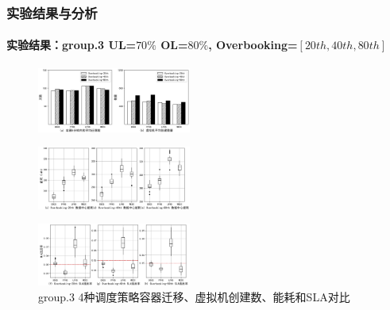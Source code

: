\begin{frame}
\frametitle{实验结果与分析}
\framesubtitle{实验结果：group.3 \textbf{UL=$70\%$ OL=$80\%$, Overbooking=$[20th,40th,80th]$}}
\begin{minipage}{\textwidth}
    \centering
    \begin{figure}[htb]
    \centering
    \includegraphics[width=0.45\textwidth]{figures/fig17_4-6_a.png}
    \end{figure}
\end{minipage}
\begin{minipage}{\textwidth}
    \centering
    \begin{figure}[htb]
    \centering
    \includegraphics[width=0.45\textwidth]{figures/fig17_4-6_b.png}
    \end{figure}
\end{minipage}
\begin{minipage}{\textwidth}
    \centering
    \begin{figure}[htb]
    \centering
    \includegraphics[width=0.45\textwidth]{figures/fig17_4-6_c.png}
    \caption{group.3 4种调度策略容器迁移、虚拟机创建数、能耗和SLA对比}
    \label{fig:fig17}
    \end{figure}
\end{minipage}
\end{frame}

